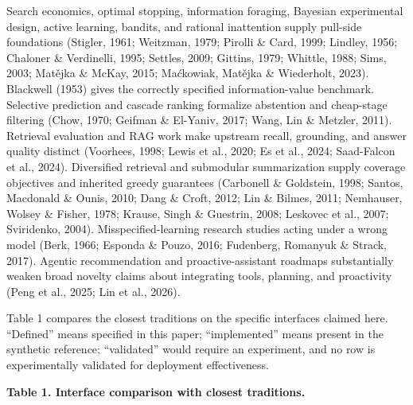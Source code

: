 \documentclass[
  11pt]{article}
\begin{document}
Search economics, optimal stopping, information foraging, Bayesian
experimental design, active learning, bandits, and rational inattention
supply pull-side foundations (Stigler, 1961; Weitzman, 1979; Pirolli \&
Card, 1999; Lindley, 1956; Chaloner \& Verdinelli, 1995; Settles, 2009;
Gittins, 1979; Whittle, 1988; Sims, 2003; Matějka \& McKay, 2015;
Maćkowiak, Matějka \& Wiederholt, 2023). Blackwell (1953) gives the
correctly specified information-value benchmark. Selective prediction
and cascade ranking formalize abstention and cheap-stage filtering
(Chow, 1970; Geifman \& El-Yaniv, 2017; Wang, Lin \& Metzler, 2011).
Retrieval evaluation and RAG work make upstream recall, grounding, and
answer quality distinct (Voorhees, 1998; Lewis et al., 2020; Es et al.,
2024; Saad-Falcon et al., 2024). Diversified retrieval and submodular
summarization supply coverage objectives and inherited greedy guarantees
(Carbonell \& Goldstein, 1998; Santos, Macdonald \& Ounis, 2010; Dang \&
Croft, 2012; Lin \& Bilmes, 2011; Nemhauser, Wolsey \& Fisher, 1978;
Krause, Singh \& Guestrin, 2008; Leskovec et al., 2007; Sviridenko,
2004). Misspecified-learning research studies acting under a wrong model
(Berk, 1966; Esponda \& Pouzo, 2016; Fudenberg, Romanyuk \& Strack,
2017). Agentic recommendation and proactive-assistant roadmaps
substantially weaken broad novelty claims about integrating tools,
planning, and proactivity (Peng et al., 2025; Lin et al., 2026).

Table 1 compares the closest traditions on the specific interfaces
claimed here. ``Defined'' means specified in this paper; ``implemented''
means present in the synthetic reference; ``validated'' would require an
experiment, and no row is experimentally validated for deployment
effectiveness.

\textbf{Table 1. Interface comparison with closest traditions.}
\end{document}

